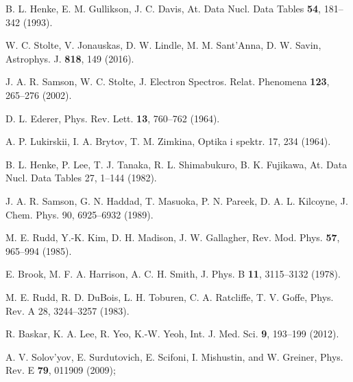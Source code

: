 \begin{thebibliography}{9}
B. L. Henke, E. M. Gullikson, J. C. Davis, 
At. Data Nucl. Data Tables \textbf{54}, 181--342 (1993).

W. C. Stolte, V. Jonauskas, D. W. Lindle, M. M. Sant'Anna, D. W. Savin, 
Astrophys. J. \textbf{818}, 149 (2016).

J. A. R. Samson, W. C. Stolte, 
J. Electron Spectros. Relat. Phenomena \textbf{123}, 265--276 (2002).

D. L. Ederer, 
Phys. Rev. Lett. \textbf{13}, 760--762 (1964).

A. P. Lukirskii, I. A. Brytov, T. M. Zimkina, 
Optika i spektr. 17, 234 (1964).

B. L. Henke, P. Lee, T. J. Tanaka, R. L. Shimabukuro, B. K. Fujikawa, 
At. Data Nucl. Data Tables 27, 1--144 (1982).

J. A. R. Samson, G. N. Haddad, T. Masuoka, P. N. Pareek, D. A. L. Kilcoyne, 
J. Chem. Phys. 90, 6925--6932 (1989).


M. E. Rudd, Y.-K. Kim, D. H. Madison, J. W. Gallagher, 
Rev. Mod. Phys. \textbf{57}, 965--994 (1985).

E. Brook, M. F. A. Harrison, A. C. H. Smith, 
J. Phys. B \textbf{11}, 3115--3132 (1978).

M. E. Rudd, R. D. DuBois, L. H. Toburen, C. A. Ratcliffe, T. V. Goffe, 
Phys. Rev. A 28, 3244--3257 (1983).



R. Baskar, K. A. Lee, R. Yeo, K.-W. Yeoh,
Int. J. Med. Sci. \textbf{9}, 193--199 (2012).

A. V. Solov'yov, E. Surdutovich, E. Scifoni, I. Mishustin, and 
W. Greiner, 
Phys. Rev. E \textbf{79}, 011909 (2009);


\end{thebibliography}
